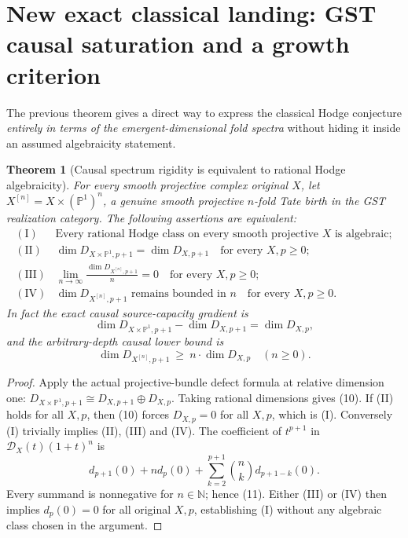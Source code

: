 \documentclass[11pt]{article}
\newtheorem{theorem}{Theorem}
\begin{document}
\section{New exact classical landing: GST causal saturation and a growth criterion}
The previous theorem gives a direct way to express the
classical Hodge conjecture \emph{entirely in terms of the
emergent-dimensional fold spectra} without hiding it
inside an assumed algebraicity statement.

\begin{theorem}[Causal spectrum rigidity is equivalent to rational Hodge algebraicity]
For every smooth projective complex original \(X\),
let \(X^{[n]}=X\times(\mathbb P^1)^n\), a genuine
smooth projective \(n\)-fold Tate birth in the GST
realization category. The following assertions are equivalent:
\[
\begin{array}{ll}
\mathrm{(I)}&
\text{Every rational Hodge class on every smooth
projective }X\text{ is algebraic};\\
\mathrm{(II)}&
\dim D_{X\times\mathbb P^1,p+1}
  =\dim D_{X,p+1}
\quad \text{for every }X,p\ge0;\\
\mathrm{(III)}&
\displaystyle\lim_{n\to\infty}
 \frac{\dim D_{X^{[n]},p+1}}{n}=0
\quad\text{for every }X,p\ge0;\\
\mathrm{(IV)}&
\dim D_{X^{[n]},p+1}\text{ remains bounded in }n
\quad\text{for every }X,p\ge0.
\end{array}                                                     \tag{9}
\]
In fact the exact \emph{causal source-capacity gradient} is
\[
 \boxed{
  \dim D_{X\times\mathbb P^1,p+1}
    -\dim D_{X,p+1}=\dim D_{X,p},}                              \tag{10}
\]
and the arbitrary-depth causal lower bound is
\[
 \boxed{
  \dim D_{X^{[n]},p+1}\ \ge\
         n\cdot\dim D_{X,p}\quad(n\ge0).}                       \tag{11}
\]
\end{theorem}
\begin{proof}
Apply the actual projective-bundle defect formula at relative
dimension one:
\(D_{X\times\mathbb P^1,p+1}
 \cong D_{X,p+1}\oplus D_{X,p}\).
Taking rational dimensions gives (10). If (II)
holds for all \(X,p\), then (10) forces
\(D_{X,p}=0\) for all \(X,p\), which is (I).
Conversely (I) trivially implies (II), (III) and
(IV). The coefficient of \(t^{p+1}\) in
\(\mathcal D_X(t)(1+t)^n\) is
\[
 d_{p+1}(0)+n d_p(0)+
      \sum_{k=2}^{p+1}{n\choose k}d_{p+1-k}(0).
\]
Every summand is nonnegative for \(n\in\mathbb N\);
hence (11). Either (III) or (IV) then implies
\(d_p(0)=0\) for all original \(X,p\), establishing
(I) without any algebraic class chosen in the argument.
\end{proof}
\end{document}
